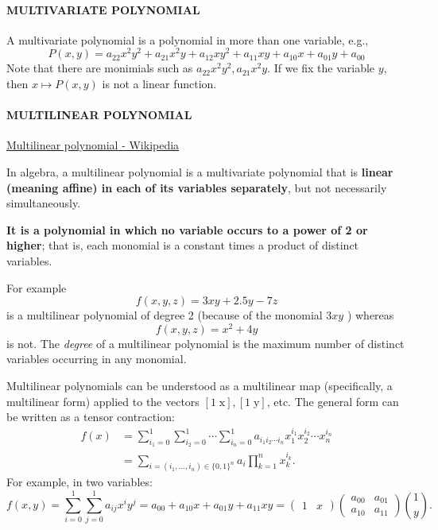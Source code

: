 
\paragraph{MULTIVARIATE POLYNOMIAL}

A multivariate polynomial is a polynomial in more than one variable, e.g., 
\begin{equation}
    P(x, y)
=a_{22} x^2 y^2+a_{21} x^2 y+a_{12} x y^2+a_{11} x y+a_{10} x+a_{01} y+a_{00}
\end{equation}
Note that there are monimials such as $a_{22} x^2 y^2, a_{21} x^2 y$. If we fix the variable $y$, then $x \mapsto P(x,y)$ is not a linear function.

\paragraph{MULTILINEAR POLYNOMIAL} %

\href{https://en.wikipedia.org/wiki/Multilinear_polynomial}{Multilinear polynomial - Wikipedia}

In algebra, a multilinear polynomial is a multivariate polynomial that is \textbf{linear (meaning affine) in each of its variables separately}, but not necessarily simultaneously. 

\textbf{It is a polynomial in which no variable occurs to a power of 2 or higher}; that is, each monomial is a constant times a product of distinct variables. 

For example 
\begin{equation}
    f(x, y, z)=3 x y+2.5 y -7 z
\end{equation}
is a multilinear polynomial of degree 2 (because of the monomial $3 x y$ ) whereas 
\begin{equation}
    f(x, y, z)=x^2+4 y
\end{equation}
is not. The \textit{degree} of a multilinear polynomial is the maximum number of distinct variables occurring in any monomial.

Multilinear polynomials can be understood as a multilinear map (specifically, a multilinear form) applied to the vectors $[1 \; \mathrm{x}],[1 \; \mathrm{y}]$, etc. The general form can be written as a tensor contraction:
\begin{align}
    f(x)&=\sum_{i_1=0}^1 \sum_{i_2=0}^1 \cdots \sum_{i_n=0}^1 a_{i_1 i_2 \cdots i_n} x_1^{i_1} x_2^{i_2} \cdots x_n^{i_n}\\
    &=\sum_{i=\left(i_1, \ldots ,i_n\right) \in\{0,1\}^n} a_i \prod_{k=1}^n x_k^{i_k}.
\end{align}
For example, in two variables:
\begin{equation}
    f(x, y)=\sum_{i=0}^1 \sum_{j=0}^1 a_{i j} x^i y^j=a_{00}+a_{10} x+a_{01} y+a_{11} x y=\left(\begin{array}{ll}
1 & x
\end{array}\right)\left(\begin{array}{cc}
a_{00} & a_{01} \\
a_{10} & a_{11}
\end{array}\right)\binom{1}{y}.
\end{equation}